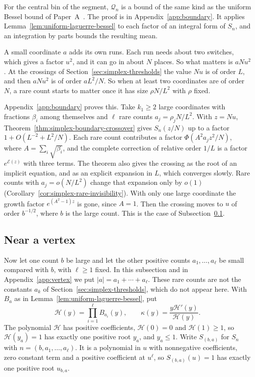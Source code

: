 For the central bin of the segment, $\mathcal Q_n$ is a bound of the same kind as the uniform Bessel bound of
Paper~A~\cite[Theorem~3.3]{paperA}. The proof is in Appendix~\ref{app:boundary}.
It applies Lemma~\ref{lem:uniform-laguerre-bessel} to each factor of an integral
form of $S_n$, and an integration by parts bounds the resulting mean.

\begin{remark}\label{rem:crossover-scale}
A small coordinate $a$ adds its own runs. Each run needs about two switches,
which gives a factor $u^2$, and it can go in about $N$ places. So what matters
is $aNu^2$. At the crossings of Section~\ref{sec:simplex-thresholds} the value
$Nu$ is of order $L$, and then $aNu^2$ is of order $aL^2/N$. So when at least
two coordinates are of order $N$, a rare count starts to matter once it has
size $\rho N/L^2$ with $\rho$ fixed.

Appendix~\ref{app:boundary} proves this. Take $k_1\ge2$ large coordinates with
fractions $\beta_i$ among themselves and $\ell$ rare counts $a_j=\rho_jN/L^2$.
With $z=Nu$, Theorem~\ref{thm:simplex-boundary-crossover} gives $S_n(z/N)$ up to
a factor $1+O(L^{-2}+L^2/N)$. Each rare count contributes a factor
$\Phi(A^2a_jz^2/N)$, where $A=\sum_i\sqrt{\beta_i}$, and the complete correction
of relative order $1/L$ is a factor $e^{\mathcal E(z)}$ with three terms. The
theorem also gives the crossing as the root of an implicit equation, and as an
explicit expansion in $L$, which converges slowly. Rare counts with
$a_j=o(N/L^2)$ change that expansion only by $o(1)$
(Corollary~\ref{cor:simplex-rare-invisibility}). With only one large coordinate
the growth factor $e^{(A^2-1)z}$ is gone, since $A=1$. Then the crossing moves
to $u$ of order $b^{-1/2}$, where $b$ is the large count. This is the case of
Subsection~\ref{sec:vertex-completion}.
\end{remark}

\subsection{Near a vertex}\label{sec:vertex-completion}

Now let one count $b$ be large and let the other positive counts
$a_1,\ldots,a_\ell$ be small compared with $b$, with $\ell\ge1$ fixed. In
this subsection and in Appendix~\ref{app:vertex} we put
$|a|=a_1+\cdots+a_\ell$. These rare counts are not the constants $a_k$ of
Section~\ref{sec:simplex-thresholds}, which do not appear here. With
$B_a$ as in Lemma~\ref{lem:uniform-laguerre-bessel}, put
\[
\mathcal H(y)=\prod_{i=1}^{\ell}B_{a_i}(y),\qquad
\kappa(y)=\frac{y\mathcal H'(y)}{\mathcal H(y)}.
\]
The polynomial $\mathcal H$ has positive coefficients, $\mathcal H(0)=0$ and
$\mathcal H(1)\ge1$, so $\mathcal H(y_a)=1$ has exactly one positive root
$y_a$, and $y_a\le1$. Write $S_{(b,a)}$ for $S_n$ with
$n=(b,a_1,\ldots,a_\ell)$. It is a polynomial in $u$ with nonnegative
coefficients, zero constant term and a positive coefficient at $u^\ell$, so
$S_{(b,a)}(u)=1$ has exactly one positive root $u_{b,a}$.

